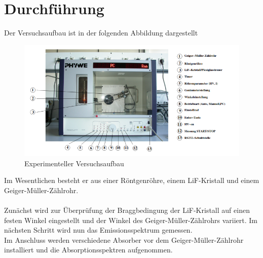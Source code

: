 \section{Durchführung}
\label{sec:Durchführung}

Der Versuchsaufbau ist in der folgenden Abbildung dargestellt
\begin{figure}
    \centering
    \includegraphics{Röntgenröhre.png}
    \caption{Experimenteller Versuchsaufbau}
    \label{fig:hex}
  \end{figure}
Im Wesentlichen besteht er aus einer Röntgenröhre, einem LiF-Kristall und einem 
Geiger-Müller-Zählrohr. 
\\
\\
Zunächst wird zur Überprüfung der Braggbedingung der LiF-Kristall auf einen festen Winkel eingestellt
und der Winkel des Geiger-Müller-Zählrohrs variiert. Im nächsten Schritt wird nun das 
Emissionsspektrum gemessen.\\
Im Anschluss werden verschiedene Absorber vor dem Geiger-Müller-Zählrohr installiert und die 
Absorptionsspektren aufgenommen.